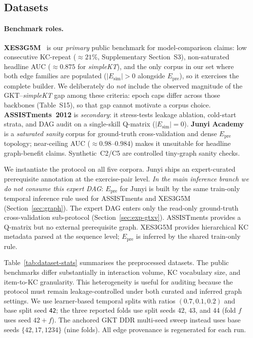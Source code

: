 \documentclass[preprint,10pt,doubleblind]{elsarticle}
\newcommand{\Epre}{\ensuremath{E_{\text{pre}}}}
\newcommand{\Esim}{\ensuremath{E_{\text{sim}}}}
\newcommand{\DDR}{\textsc{DDR}}
\begin{document}
\subsection{Datasets}
\label{sec:datasets}
\paragraph{Benchmark roles.}
\textbf{XES3G5M}~\cite{xes3g5m2023} is our \emph{primary} public benchmark for
model-comparison claims: low consecutive KC-repeat (${\approx}21\%$,
Supplementary Section~S3), non-saturated headline AUC (${\approx}0.875$ for
\textit{simpleKT}), and the only corpus in our set where both edge families are
populated ($|\Esim|{>}0$ alongside $\Epre$), so it exercises the complete
builder. We deliberately do \emph{not} include the observed magnitude of the
GKT--\textit{simpleKT} gap among these criteria: epoch caps differ across those
backbones (Table~S15), so that gap cannot motivate a corpus choice.
\textbf{ASSISTments~2012} is \emph{secondary}: it
stress-tests leakage ablation, cold-start strata, and DAG audit on a
single-skill Q-matrix ($|\Esim|{=}0$). \textbf{Junyi Academy}
\cite{junyi_dataset} is a \emph{saturated sanity} corpus for ground-truth
cross-validation and dense $\Epre$ topology; near-ceiling AUC
(${\approx}0.98$--$0.984$) makes it unsuitable for headline graph-benefit
claims. Synthetic~C2/C5 are controlled tiny-graph sanity checks.

We instantiate the protocol on all five corpora. Junyi ships an
expert-curated prerequisite annotation at the exercise-pair level.
\emph{In the main inference branch we do not consume this expert DAG}:
$\Epre$ for Junyi is built by the same train-only temporal inference rule
used for ASSISTments and XES3G5M (Section~\ref{sec:graph}). The expert DAG
enters only the read-only ground-truth cross-validation sub-protocol
(Section~\ref{sec:exp-gtxv}). ASSISTments provides a Q-matrix but no
external prerequisite graph. XES3G5M provides hierarchical KC metadata parsed
at the sequence level; $\Epre$ is inferred by the shared train-only rule.

Table~\ref{tab:dataset-stats} summarises the preprocessed datasets.
The public benchmarks differ substantially in interaction volume, KC
vocabulary size, and item-to-KC granularity. This heterogeneity is
useful for auditing because the protocol must remain leakage-controlled
under both curated and inferred graph settings. We use learner-based
temporal splits with ratios $(0.7,0.1,0.2)$ and base split seed
\texttt{42}; the three reported folds use split seeds $42$, $43$, and
$44$ (fold $f$ uses seed $42{+}f$). The anchored GKT \DDR{} multi-seed
sweep instead uses base seeds $\{42,17,1234\}$ (nine folds). All edge
provenance is regenerated for each run.
\end{document}
